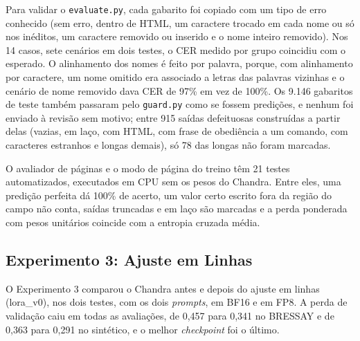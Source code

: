 \documentclass[12pt,a4paper]{article}
\begin{document}
Para validar o \texttt{evaluate.py}, cada gabarito foi copiado com um tipo de erro conhecido (sem erro, dentro de HTML, um caractere trocado em cada nome ou só nos inéditos, um caractere removido ou inserido e o nome inteiro removido). Nos 14 casos, sete cenários em dois testes, o CER medido por grupo coincidiu com o esperado. O alinhamento dos nomes é feito por palavra, porque, com alinhamento por caractere, um nome omitido era associado a letras das palavras vizinhas e o cenário de nome removido dava CER de 97\% em vez de 100\%. Os 9.146 gabaritos de teste também passaram pelo \texttt{guard.py} como se fossem predições, e nenhum foi enviado à revisão sem motivo; entre 915 saídas defeituosas construídas a partir delas (vazias, em laço, com HTML, com frase de obediência a um comando, com caracteres estranhos e longas demais), só 78 das longas não foram marcadas.

O avaliador de páginas e o modo de página do treino têm 21 testes automatizados, executados em CPU sem os pesos do Chandra. Entre eles, uma predição perfeita dá 100\% de acerto, um valor certo escrito fora da região do campo não conta, saídas truncadas e em laço são marcadas e a perda ponderada com pesos unitários coincide com a entropia cruzada média.

\subsection{Experimento 3: Ajuste em Linhas}
\label{subsec:exp3}

O Experimento 3 comparou o Chandra antes e depois do ajuste em linhas (lora\_v0), nos dois testes, com os dois \emph{prompts}, em BF16 e em FP8. A perda de validação caiu em todas as avaliações, de 0,457 para 0,341 no BRESSAY e de 0,363 para 0,291 no sintético, e o melhor \emph{checkpoint} foi o último.
\end{document}
